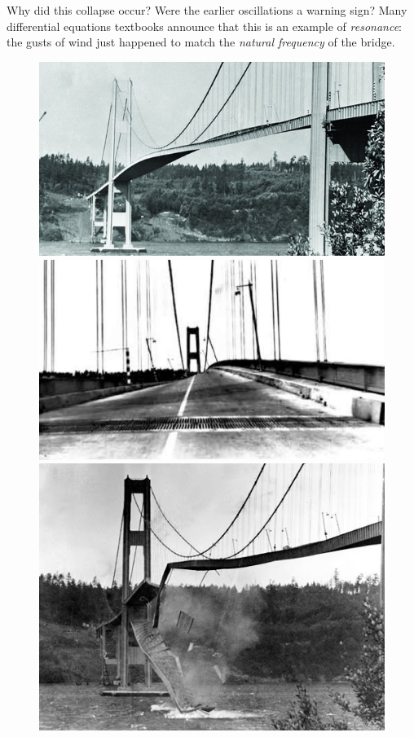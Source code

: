 \documentclass{article}
\theoremstyle{definition}
\begin{document}
Why did this collapse occur? Were the earlier oscillations a warning
sign? Many differential equations textbooks announce that this is an
example of {\it resonance}: the gusts of wind just happened to match the
{\it natural frequency} of the bridge.
\begin{figure}[!htb]
  \includegraphics[width=\linewidth]{tac01}
\endminipage\hfill
{}
  \includegraphics[width=\linewidth]{tac02}
\endminipage\hfill
{}%
  \includegraphics[width=\linewidth]{tac03}
\endminipage
\end{figure}
\end{document}
